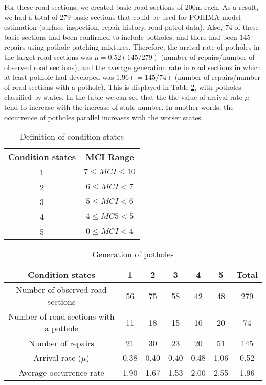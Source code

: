 \documentclass[Journal]{ascelike}
\begin{document}
For these road sections, we created basic road sections of 200m each. As a result, we had a total of 279 basic sections that could be used for POHIMA model estimation (surface inspection, repair history, road patrol data). Also, 74 of these basic sections had been confirmed to include potholes, and there had been 145 repairs using pothole patching mixtures. Therefore, the arrival rate of potholes in the target road sections was $\mu=0.52 (145/279)$ (number of repairs/number of observed road sections), and the average generation rate in road sections in which at least pothole had developed was $1.96$$(=145/74)$ (number of repairs/number of road sections with a pothole). This is displayed in Table \ref{4inspection}, with potholes classified by states. In the table we can see that the the value of arrival rate $\mu$ tend to increase with the increase of state number. In another words, the occurrence of potholes parallel increases with the worser states.
%
%
\begin{table}[t]
\begin{center}
\caption{Definition of condition states}
\label{4def}
{\footnotesize
\begin{tabular}{c|c} \hline
Condition states & MCI Range \\\hline
1 & $7 \leq MCI \leq 10$   \\
2 & $6 \leq MCI <7$   \\
3 & $5 \leq MCI <6$   \\
4 & $4 \leq MC5 <5$   \\
5 & $0 \leq MCI <4$   \\ \hline
\end{tabular}
}
\end{center}
\end{table}
%
%
\begin{table}[t]
\centering
\caption{Generation of potholes}
\label{4inspection}
{\footnotesize
\begin{tabular}{c|ccccc|c} \hline
Condition states & 1 & 2 & 3 & 4 & 5 & Total \\\hline
Number of observed road sections & 56 & 75 & 58 & 42 & 48 & 279 \\
Number of road sections with a pothole & 11 & 18 & 15 & 10 & 20 & 74 \\
Number of repairs & 21 & 30 & 23 & 20 & 51 & 145 \\
Arrival rate ($\mu$) & 0.38  & 0.40  & 0.40  & 0.48  & 1.06  & 0.52  \\
Average occurrence rate & 1.90 & 1.67 & 1.53 & 2.00 & 2.55 & 1.96 \\\hline

\end{tabular}}
\end{table}$$
\end{document}

